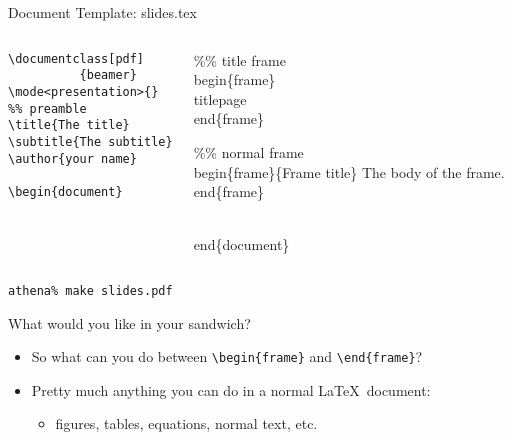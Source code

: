 \documentclass[pdf]{beamer}
\begin{document}
\begin{frame}[fragile]{Document Template: slides.tex}
\begin{columns}[t]
  \begin{block}{}
    \begin{verbatim}
\documentclass[pdf]
          {beamer}
\mode<presentation>{}
%% preamble
\title{The title}
\subtitle{The subtitle}
\author{your name}

\begin{document}
  	\end{verbatim}	
  \end{block}
  
	\begin{block}{}
		\begin{semiverbatim}
\%\% title frame
\\begin\{frame\}
    \\titlepage
\\end\{frame\}

\%\% normal frame
\\begin\{frame\}\{Frame title\}
    The body of the frame.
\\end\{frame\}

\\end\{document\}
		\end{semiverbatim}
	\end{block}
\end{columns}
\verb+athena% make slides.pdf+
\end{frame}

\begin{frame}[fragile]{What would you like in your sandwich?}
\begin{itemize}
	\item So what can you do between \verb=\begin{frame}= and \verb=\end{frame}=?
	\pause
	\item Pretty much anything you can do in a normal \LaTeX\
	document:
	\pause
	\begin{itemize}
		\item figures, tables, equations, normal text, etc.
	\end{itemize}
\end{itemize}
\end{frame}

\end{document}
